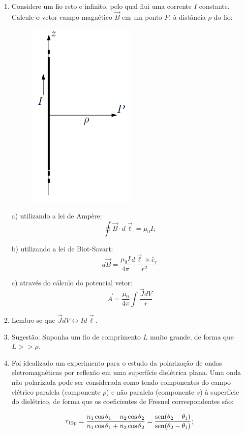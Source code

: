 \begin{enumerate}[start=1,label={\bfseries Q\arabic*.}]
\item Considere um fio reto e infinito, pelo qual flui uma corrente $I$ constante. Calcule o vetor campo magnético $\vec{B}$ em um ponto $P$, à distância $\rho$ do fio:
\begin{figure}[H]
\centering
\includegraphics[scale=0.7]{eletromag-img/fio3.png}
\end{figure}

a) utilizando a lei de Ampère:
$$
\oint \vec{B} \cdot d \vec{\ell} = \mu_{0} I;
$$

\resposta

b) utilizando a lei de Biot-Savart:
$$
d \vec{B} = \frac{\mu_{0} I}{4 \pi} \frac{d \vec{\ell} \times \hat{e}_{r}}{r^{2}}
$$

\resposta

c) através do cálculo do potencial vetor:
$$
\vec{A} =  \frac{\mu_{0}}{4 \pi} \int \frac{\vec{J} dV}{r}
$$
\item[  ] Lembre-se que $ \vec{J} dV \longleftrightarrow I d \vec{\ell} $.
\item[  ] Sugestão: Suponha um fio de comprimento $L$ muito grande, de forma que $L >> \rho$.

\resposta



\item Foi idealizado um experimento para o estudo da polarização de ondas eletromagnéticas por reflexão em uma superfície dielétrica plana. Uma onda não polarizada pode ser considerada como tendo componentes do campo elétrico paralela (componente $p$) e não paralela (componente $s$) à superfície do dielétrico, de forma que os coeficientes de Fresnel correspondentes são:
\begin{multicols}{2}
$$
r_{12p} = \frac{n_{1} \operatorname{cos} \theta_{1} - n_{2} \operatorname{cos} \theta_{2}}{n_{1} \operatorname{cos} \theta_{1} + n_{2} \operatorname{cos} \theta_{2}} = \frac{\operatorname{sen}( \theta_{2} - \theta_{1} )}{\operatorname{sen}( \theta_{2} - \theta_{1} )}; \\
$$


\end{multicols}
\end{enumerate}
